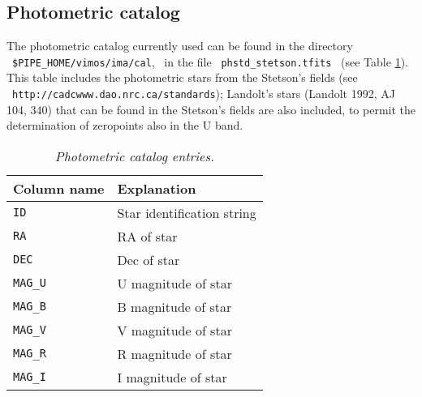 \subsection{Photometric catalog} 

The photometric catalog currently used can be 
found in the directory  \ {\tt \$PIPE\_HOME/vimos/ima/cal}, 
\ in the file \ {\tt phstd\_stetson.tfits} \ (see Table \ref{STETSON}). 
This table includes the photometric stars from the Stetson's fields 
(see \ {\tt http://cadcwww.dao.nrc.ca/standards}); Landolt's stars 
(Landolt 1992, AJ 104, 340) that can be found in the Stetson's fields 
are also included, to permit the determination of zeropoints also in 
the U band.

\begin{table}[h]
  \begin{center}
    \begin{tabular}{|l|l|}
    \hline
      {\bf Column name} & {\bf Explanation} \\
    \hline
      {\tt ID}       & Star identification string \\
      {\tt RA}       & RA of star \\
      {\tt DEC}      & Dec of star \\
      {\tt MAG\_U}   & U magnitude of star \\
      {\tt MAG\_B}   & B magnitude of star \\
      {\tt MAG\_V}   & V magnitude of star \\
      {\tt MAG\_R}   & R magnitude of star \\
      {\tt MAG\_I}   & I magnitude of star \\
    \hline
    \end{tabular}
    \caption{\it Photometric catalog entries.}
    \label{STETSON}
  \end{center}
\end{table}

\newpage


\newpage
